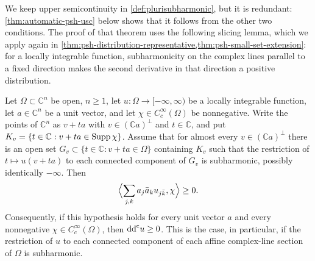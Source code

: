 We keep upper semicontinuity in \cref{def:plurisubharmonic}, but it is redundant: \cref{thm:automatic-psh-usc} below shows that it follows from the other two conditions. The proof of that theorem uses the following slicing lemma, which we apply again in \cref{thm:psh-distribution-representative,thm:psh-small-set-extension}: for a locally integrable function, subharmonicity on the complex lines parallel to a fixed direction makes the second derivative in that direction a positive distribution.

\begin{lemma}\label{lem:psh-line-slicing}
Let $\Omega\subset\mathbb{C}^n$ be open, $n\ge1$, let $u\colon\Omega\to[-\infty,\infty)$ be a locally integrable function, let $a\in\mathbb{C}^n$ be a unit vector, and let $\chi\in C^\infty_c(\Omega)$ be nonnegative. Write the points of $\mathbb{C}^n$ as $v+ta$ with $v\in(\mathbb{C}a)^\perp$ and $t\in\mathbb{C}$, and put $K_v=\{t\in\mathbb{C}:v+ta\in\operatorname{Supp}\chi\}$. Assume that for almost every $v\in(\mathbb{C}a)^\perp$ there is an open set $G_v\subset\{t\in\mathbb{C}:v+ta\in\Omega\}$ containing $K_v$ such that the restriction of $t\mapsto u(v+ta)$ to each connected component of $G_v$ is subharmonic, possibly identically $-\infty$. Then
\[
 \Bigl\langle\sum_{j,k}a_j\bar a_ku_{j\bar k},\chi\Bigr\rangle\geq0.
\]
Consequently, if this hypothesis holds for every unit vector $a$ and every nonnegative $\chi\in C^\infty_c(\Omega)$, then $\mathrm{dd}^{\mathrm{c}} u\geq0$. This is the case, in particular, if the restriction of $u$ to each connected component of each affine complex-line section of $\Omega$ is subharmonic.
\end{lemma}
